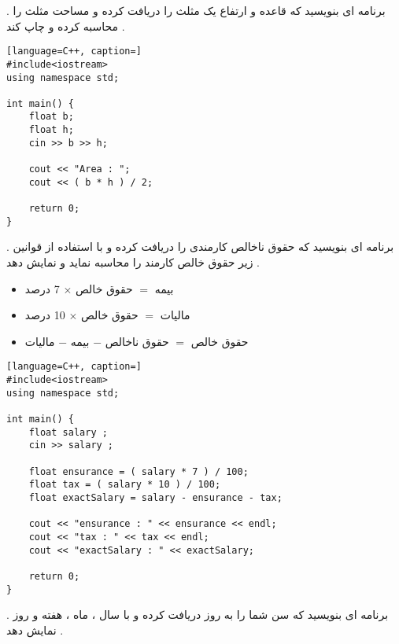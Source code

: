 \documentclass[12pt]{article}
\begin{document}
 . برنامه ای بنویسید که قاعده و ارتفاع یک مثلث را دریافت کرده و مساحت مثلث را محاسبه کرده و چاپ کند .


\begin{latin}
\begin{lstlisting}[language=C++, caption=]
#include<iostream>
using namespace std;

int main() {
	float b;
	float h;
	cin >> b >> h;
	
	cout << "Area : ";
	cout << ( b * h ) / 2;
	
	return 0;
}
\end{lstlisting}
\end{latin}



 . برنامه ای بنویسید که حقوق ناخالص کارمندی را دریافت کرده و با استفاده از قوانین زیر حقوق خالص کارمند را محاسبه نماید و نمایش دهد .

\begin{itemize}
	\item بیمه $=$ حقوق خالص 
	$\times$ 7 درصد
	\item مالیات $=$ حقوق خالص 
	$\times$ 10 درصد
	\item حقوق خالص $=$ حقوق ناخالص $-$ بیمه $-$ مالیات
\end{itemize}





\begin{latin}
\begin{lstlisting}[language=C++, caption=]
#include<iostream>
using namespace std;

int main() {
	float salary ;
	cin >> salary ;
	
	float ensurance = ( salary * 7 ) / 100;
	float tax = ( salary * 10 ) / 100;
	float exactSalary = salary - ensurance - tax;
	
	cout << "ensurance : " << ensurance << endl;
	cout << "tax : " << tax << endl;
	cout << "exactSalary : " << exactSalary;
	
	return 0;
}
\end{lstlisting}
\end{latin}



\newpage


 . برنامه ای بنویسید که سن شما را به روز دریافت کرده و با سال ، ماه ، هفته و روز نمایش دهد .  
\end{document}

